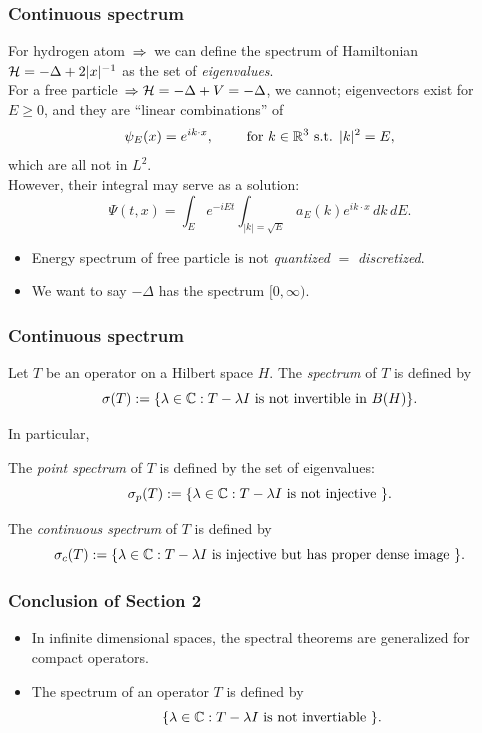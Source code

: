 \documentclass[10pt]{beamer}
\begin{document}
\begin{frame}
\frametitle{Continuous spectrum}
  For hydrogen atom $\impl$ we can define the spectrum of Hamiltonian $\mathcal{H}=-\Delta+2|x|^{-1}$ as the set of \emph{eigenvalues}.\\
  \bigskip
  \pause For a free particle $\impl$\pause$\mathcal{H}=-\Delta+V=-\Delta$, we cannot; eigenvectors exist for $E\ge0$, and they are ``linear combinations'' of
  \[\psi_E(x)=e^{ik\cdot x},\qquad\text{ for }k\in\mathbb{R}^3\text{ s.t. }|k|^2=E,\]
  which are all not in $L^2$.\\
  \bigskip
  \pause However, their integral may serve as a solution:
  \[\Psi(t,x)=\int_Ee^{-iEt}\int_{|k|=\sqrt E}a_E(k)e^{ik\cdot x}\,dk\,dE.\]
  \pause
  \begin{itemize}
    \item Energy spectrum of free particle is not \emph{quantized} $=$ \emph{discretized}.
    \item We want to say $-\Delta$ has the spectrum $[0,\infty)$.
  \end{itemize}
\end{frame}

\begin{frame}
\frametitle{Continuous spectrum}
  \begin{defn}
    Let $T$ be an operator on a Hilbert space $H$.
    The \emph{spectrum} of $T$ is defined by
    \[\sigma(T):=\{\lambda\in\mathbb{C}:T-\lambda I\text{ is not invertible in }B(H)\}.\]
  \end{defn}
  \pause In particular,
  \begin{defn}
    The \emph{point spectrum} of $T$ is defined by the set of eigenvalues:
    \[\sigma_p(T):=\{\lambda\in\mathbb{C}:T-\lambda I\text{ is not injective }\}.\]
  \end{defn}
  \vspace{-1em}
  \begin{defn}
    The \emph{continuous spectrum} of $T$ is defined by
    \[\sigma_c(T):=\{\lambda\in\mathbb{C}:T-\lambda I\text{ is injective but has proper dense image }\}.\]
  \end{defn}
\end{frame}

\begin{frame}
\frametitle{Conclusion of Section 2}
  \begin{itemize}
    \item In infinite dimensional spaces, the spectral theorems are generalized for compact operators.
    \item The spectrum of an operator $T$ is defined by
    \[\{\lambda\in\mathbb{C}:T-\lambda I\text{ is not invertiable }\}.\]
  \end{itemize}
\end{frame}
\end{document}
